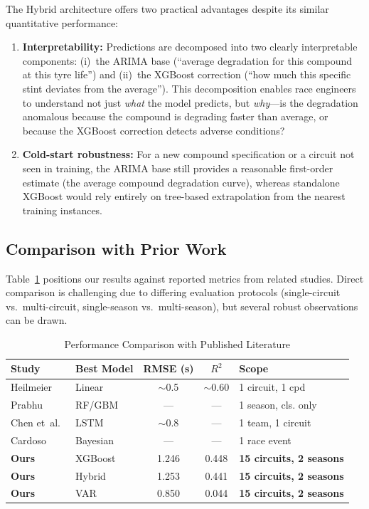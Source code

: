 \documentclass[journal,twoside]{IEEEtran}
\begin{document}
The Hybrid architecture offers two practical advantages despite its
similar quantitative performance:

\begin{enumerate}
  \item \textbf{Interpretability:}  Predictions are decomposed into two
  clearly interpretable components: (i)~the ARIMA base (``average
  degradation for this compound at this tyre life'') and (ii)~the
  XGBoost correction (``how much this specific stint deviates from the
  average'').  This decomposition enables race engineers to understand
  not just \emph{what} the model predicts, but \emph{why}---is the
  degradation anomalous because the compound is degrading faster than
  average, or because the XGBoost correction detects adverse conditions?

  \item \textbf{Cold-start robustness:}  For a new compound
  specification or a circuit not seen in training, the ARIMA base still
  provides a reasonable first-order estimate (the average compound
  degradation curve), whereas standalone XGBoost would rely entirely on
  tree-based extrapolation from the nearest training instances.
\end{enumerate}

\subsection{Comparison with Prior Work}

Table~\ref{tab:lit_metrics} positions our results against reported
metrics from related studies.  Direct comparison is challenging due to
differing evaluation protocols (single-circuit vs.\ multi-circuit,
single-season vs.\ multi-season), but several robust observations can be
drawn.

\begin{table}[!t]
\caption{Performance Comparison with Published Literature}
\label{tab:lit_metrics}
\centering
\footnotesize
\begin{tabular}{@{}llccl@{}}
\toprule
\textbf{Study} & \textbf{Best Model} & \textbf{RMSE (s)} & \textbf{$R^{2}$} & \textbf{Scope} \\
\midrule
Heilmeier~\cite{heilmeier2020race}  & Linear     & $\sim$0.5 & $\sim$0.60 & 1 circuit, 1 cpd \\
Prabhu~\cite{prabhu2023machine}     & RF/GBM     & ---       & ---        & 1 season, cls. only \\
Chen et~al.~\cite{lstm_deg2022}     & LSTM       & $\sim$0.8 & ---        & 1 team, 1 circuit \\
Cardoso~\cite{cardoso2023bayesian}  & Bayesian   & ---       & ---        & 1 race event \\
\midrule
\textbf{Ours} & XGBoost & 1.246 & 0.448 & \textbf{15 circuits, 2 seasons} \\
\textbf{Ours} & Hybrid  & 1.253 & 0.441 & \textbf{15 circuits, 2 seasons} \\
\textbf{Ours} & VAR     & 0.850 & 0.044 & \textbf{15 circuits, 2 seasons} \\
\bottomrule
\end{tabular}
\end{table}
\end{document}
